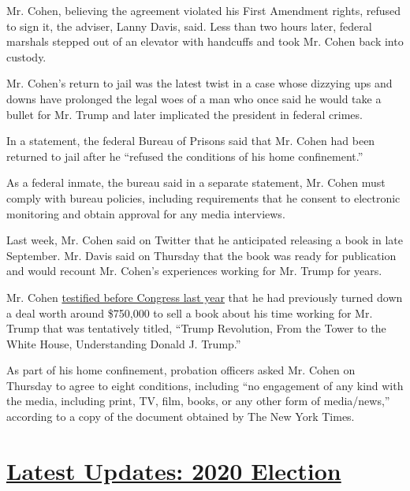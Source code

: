 Mr. Cohen, believing the agreement violated his First Amendment rights,
refused to sign it, the adviser, Lanny Davis, said. Less than two hours
later, federal marshals stepped out of an elevator with handcuffs and
took Mr. Cohen back into custody.

Mr. Cohen's return to jail was the latest twist in a case whose dizzying
ups and downs have prolonged the legal woes of a man who once said he
would take a bullet for Mr. Trump and later implicated the president in
federal crimes.

In a statement, the federal Bureau of Prisons said that Mr. Cohen had
been returned to jail after he ``refused the conditions of his home
confinement.''

As a federal inmate, the bureau said in a separate statement, Mr. Cohen
must comply with bureau policies, including requirements that he consent
to electronic monitoring and obtain approval for any media interviews.

Last week, Mr. Cohen said on Twitter that he anticipated releasing a
book in late September. Mr. Davis said on Thursday that the book was
ready for publication and would recount Mr. Cohen's experiences working
for Mr. Trump for years.

Mr. Cohen
\href{https://www.nytimes.com/2019/02/27/us/politics/michael-cohen-trump.html?action=click\&module=RelatedLinks\&pgtype=Article}{testified
before Congress last year} that he had previously turned down a deal
worth around \$750,000 to sell a book about his time working for Mr.
Trump that was tentatively titled, ``Trump Revolution, From the Tower to
the White House, Understanding Donald J. Trump.''

As part of his home confinement, probation officers asked Mr. Cohen on
Thursday to agree to eight conditions, including ``no engagement of any
kind with the media, including print, TV, film, books, or any other form
of media/news,'' according to a copy of the document obtained by The New
York Times.

\hypertarget{latest-updates-2020-election}{%
\section{\texorpdfstring{\href{https://www.nytimes.com/2020/07/31/us/elections/biden-vs-trump.html?action=click\&pgtype=Article\&state=default\&region=MAIN_CONTENT_1\&context=storylines_live_updates}{Latest
Updates: 2020
Election}}{Latest Updates: 2020 Election}}\label{latest-updates-2020-election}}

